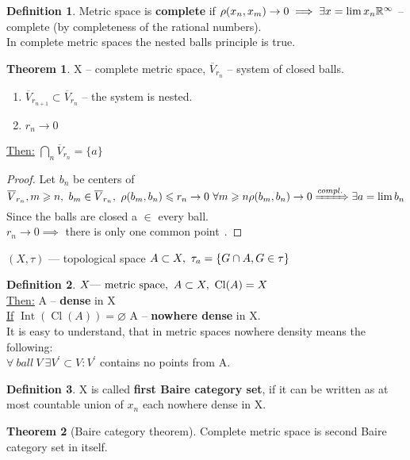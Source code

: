 \documentclass[12pt, fleqn]{article}
\theoremstyle{definition}
\newtheorem*{defn}{Definition}
\theoremstyle{break}
\newtheorem{thm}{Theorem}[section]
\theoremstyle{theorem}
\renewcommand\leq{\leqslant}
\renewcommand\geq{\geqslant}
\newcommand{\R}{\mathbb{R}}
\DeclareMathOperator{\clOp}{Cl}
\newcommand{\cl}[1]{\clOp({#1})}
\DeclareMathOperator{\intOp}{Int}
\newcommand{\inter}[1]{\intOp({#1})}
\begin{document}
\begin{defn}
  Metric space is \textbf{complete} if $\rho(x_n, x_m) \to 0 \implies \exists x = \lim x_n \\
  \R^\infty$ -- complete (by completeness of the rational numbers). \\
  In complete metric spaces the nested balls principle is true.
\end{defn}
\begin{thm}
  X -- complete metric space, $\overline{V}_{r_n}$ -- system of closed balls. \\
  \begin{enumerate}
      \item $\overline{V}_{r_{n + 1}} \subset \overline{V}_{r_n}$ -- the system is nested.
      \item $r_n \to 0$
    \end{enumerate}
  \underline{Then:} $\bigcap\limits_n \overline{V}_{r_n} = \{a\}$
\end{thm}
\begin{proof}
  Let $b_n$ be centers of $\overline{V}_{r_n}, \\
  m \geq n,\ b_m \in \overline{V}_{r_n},\ \rho(b_m, b_n) \leq r_n \to 0\ \forall m \geq n \\
  \rho(b_m, b_n) \to 0 \xRightarrow{compl.} \exists a = \lim b_n$
  Since the balls are closed a $\in$ every ball. \\
  $r_n \to 0 \implies$ there is only one common point $\qedhere$.
\end{proof}
\noindent
$(X, \tau)$ --- topological space
$\\A \subset X,\ \tau_a = \{G \cap A, G \in \tau\}$
\begin{defn}
  $X \textnormal{--- metric space},\ A \subset X,\ \cl{A} = X$ \\
  \underline{Then:} A -- \textbf{dense} in X \\
  \underline{If} $\inter{\cl{A}} = \varnothing$ A -- \textbf{nowhere dense} in X. \\
  It is easy to understand, that in metric spaces nowhere density means the following: \\
  $\forall\ ball\ V\ \exists V^{'} \subset V\colon V^{'}$ contains no points from A.
\end{defn}
\begin{defn}
  X is called \textbf{first Baire category set}, if it can be written as at most
  countable union of $x_n$ each nowhere dense in X.
\end{defn}
\begin{thm}[Baire category theorem]
  Complete metric space is second Baire category set in itself.
\end{thm}
\end{document}
